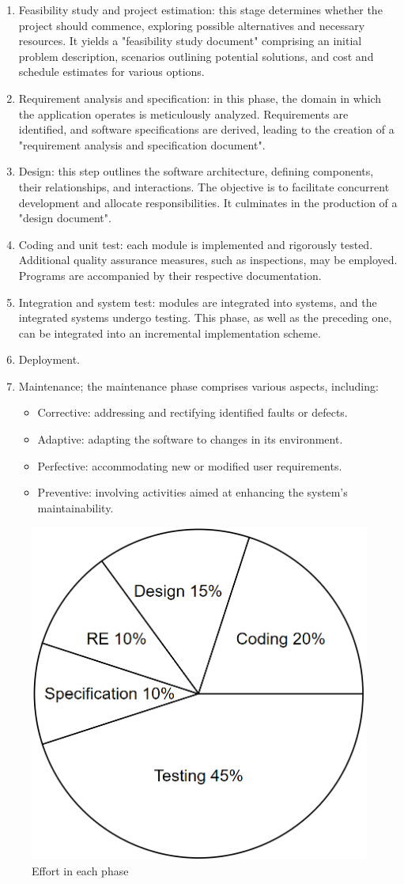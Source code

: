 \begin{enumerate}
    \item Feasibility study and project estimation: this stage determines whether the project should commence, exploring possible alternatives and necessary resources. 
        It yields a "feasibility study document" comprising an initial problem description, scenarios outlining potential solutions, and cost and schedule estimates for various options.
    \item Requirement analysis and specification: in this phase, the domain in which the application operates is meticulously analyzed. 
        Requirements are identified, and software specifications are derived, leading to the creation of a "requirement analysis and specification document". 
    \item Design: this step outlines the software architecture, defining components, their relationships, and interactions. 
        The objective is to facilitate concurrent development and allocate responsibilities. 
        It culminates in the production of a "design document". 
    \item Coding and unit test: each module is implemented and rigorously tested. 
        Additional quality assurance measures, such as inspections, may be employed. 
        Programs are accompanied by their respective documentation.
    \item Integration and system test: modules are integrated into systems, and the integrated systems undergo testing. 
        This phase, as well as the preceding one, can be integrated into an incremental implementation scheme.
    \item Deployment.
    \item Maintenance; the maintenance phase comprises various aspects, including:
        \begin{itemize}
            \item Corrective: addressing and rectifying identified faults or defects.
            \item Adaptive: adapting the software to changes in its environment.
            \item Perfective: accommodating new or modified user requirements.
            \item Preventive: involving activities aimed at enhancing the system's maintainability.
        \end{itemize}
\end{enumerate}
\begin{figure}[H]
    \centering
    \includegraphics[width=0.35\linewidth]{images/effort.png}
    \caption{Effort in each phase}
\end{figure}

